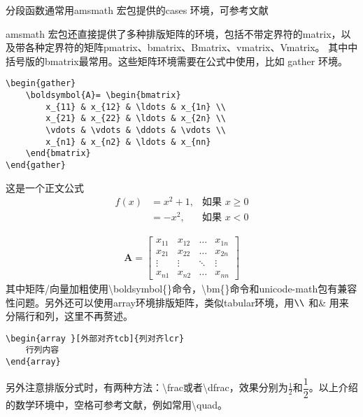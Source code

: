 分段函数通常用amsmath 宏包提供的cases 环境，可参考文献

amsmath 宏包还直接提供了多种排版矩阵的环境，包括不带定界符的matrix，以及带各种定界符的矩阵pmatrix、bmatrix、Bmatrix、vmatrix、Vmatrix。
其中中括号版的bmatrix最常用。这些矩阵环境需要在公式中使用，比如 gather 环境。
\begin{lstlisting}
\begin{gather}
	\boldsymbol{A}= \begin{bmatrix}
		x_{11} & x_{12} & \ldots & x_{1n} \\
		x_{21} & x_{22} & \ldots & x_{2n} \\
		\vdots & \vdots & \ddots & \vdots \\
		x_{n1} & x_{n2} & \ldots & x_{nn}
	\end{bmatrix}
\end{gather}
\end{lstlisting}
这是一个正文公式
\begin{equation}
	\begin{aligned}
		f(x) & = x^2 + 1, & \text{如果 } x \geq 0 \\
		     & = -x^2,    & \text{如果 } x < 0
	\end{aligned}
\end{equation}

\begin{gather}
	\boldsymbol{A}= \begin{bmatrix}
		x_{11} & x_{12} & \ldots & x_{1n} \\
		x_{21} & x_{22} & \ldots & x_{2n} \\
		\vdots & \vdots & \ddots & \vdots \\
		x_{n1} & x_{n2} & \ldots & x_{nn}
	\end{bmatrix}
\end{gather}
其中矩阵/向量加粗使用\textbackslash{}boldsymbol\{\}命令，\textbackslash{}bm\{\}命令和unicode-math包有兼容性问题。另外还可以使用array环境排版矩阵，类似tabular环境，用$ \verb|\\|$ 和\& 用来分隔行和列，这里不再赘述。
\begin{lstlisting}
\begin{array }[外部对齐tcb]{列对齐lcr}
	行列内容
\end{array}
\end{lstlisting}

另外注意排版分式时，有两种方法：\textbackslash{}frac或者\textbackslash{}dfrac，效果分别为$ \frac{1}{2} $和$ \dfrac{1}{2} $。以上介绍的数学环境中，空格可参考文献，例如常用\textbackslash{}quad。

